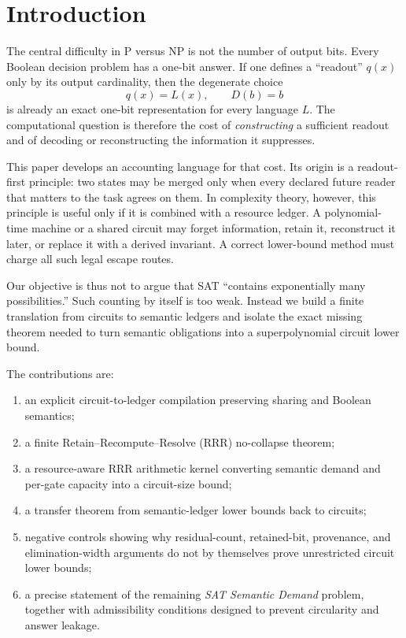 \documentclass[11pt]{article}
\begin{document}
\section{Introduction}

The central difficulty in P versus NP is not the number of output bits. Every Boolean decision problem has a one-bit answer. If one defines a ``readout'' $q(x)$ only by its output cardinality, then the degenerate choice
\[
q(x)=L(x), \qquad D(b)=b
\]
is already an exact one-bit representation for every language $L$. The computational question is therefore the cost of \emph{constructing} a sufficient readout and of decoding or reconstructing the information it suppresses.

This paper develops an accounting language for that cost. Its origin is a readout-first principle: two states may be merged only when every declared future reader that matters to the task agrees on them. In complexity theory, however, this principle is useful only if it is combined with a resource ledger. A polynomial-time machine or a shared circuit may forget information, retain it, reconstruct it later, or replace it with a derived invariant. A correct lower-bound method must charge all such legal escape routes.

Our objective is thus not to argue that SAT ``contains exponentially many possibilities.'' Such counting by itself is too weak. Instead we build a finite translation from circuits to semantic ledgers and isolate the exact missing theorem needed to turn semantic obligations into a superpolynomial circuit lower bound.

The contributions are:
\begin{enumerate}
  \item an explicit circuit-to-ledger compilation preserving sharing and Boolean semantics;
  \item a finite Retain--Recompute--Resolve (RRR) no-collapse theorem;
  \item a resource-aware RRR arithmetic kernel converting semantic demand and per-gate capacity into a circuit-size bound;
  \item a transfer theorem from semantic-ledger lower bounds back to circuits;
  \item negative controls showing why residual-count, retained-bit, provenance, and elimination-width arguments do not by themselves prove unrestricted circuit lower bounds;
  \item a precise statement of the remaining \emph{SAT Semantic Demand} problem, together with admissibility conditions designed to prevent circularity and answer leakage.
\end{enumerate}
\end{document}
